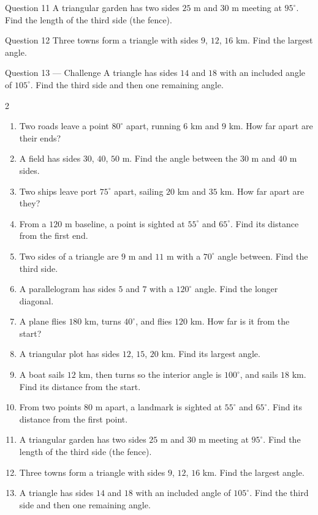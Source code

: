 \documentclass[11pt]{article}
\begin{document}
\begin{qbox}{Question 11}
A triangular garden has two sides $25$ m and $30$ m meeting at $95^\circ$. Find the length of the third side (the fence).\workspace{2.6cm}
\end{qbox}

\begin{qbox}{Question 12}
Three towns form a triangle with sides $9$, $12$, $16$ km. Find the largest angle.\workspace{2.6cm}
\end{qbox}

\begin{qbox}{Question 13 --- Challenge}
A triangle has sides $14$ and $18$ with an included angle of $105^\circ$. Find the third side and then one remaining angle.\workspace{3.2cm}
\end{qbox}

\clearpage
{}

\begin{recapbox}
\begin{multicols}{2}
\small
\begin{enumerate}[leftmargin=*,itemsep=3pt]
  \item Two roads leave a point $80^\circ$ apart, running $6$ km and $9$ km. How far apart are their ends?
  \item A field has sides $30$, $40$, $50$ m. Find the angle between the $30$ m and $40$ m sides.
  \item Two ships leave port $75^\circ$ apart, sailing $20$ km and $35$ km. How far apart are they?
  \item From a $120$ m baseline, a point is sighted at $55^\circ$ and $65^\circ$. Find its distance from the first end.
  \item Two sides of a triangle are $9$ m and $11$ m with a $70^\circ$ angle between. Find the third side.
  \item A parallelogram has sides $5$ and $7$ with a $120^\circ$ angle. Find the longer diagonal.
  \item A plane flies $180$ km, turns $40^\circ$, and flies $120$ km. How far is it from the start?
  \item A triangular plot has sides $12$, $15$, $20$ km. Find its largest angle.
  \item A boat sails $12$ km, then turns so the interior angle is $100^\circ$, and sails $18$ km. Find its distance from the start.
  \item From two points $80$ m apart, a landmark is sighted at $55^\circ$ and $65^\circ$. Find its distance from the first point.
  \item A triangular garden has two sides $25$ m and $30$ m meeting at $95^\circ$. Find the length of the third side (the fence).
  \item Three towns form a triangle with sides $9$, $12$, $16$ km. Find the largest angle.
  \item A triangle has sides $14$ and $18$ with an included angle of $105^\circ$. Find the third side and then one remaining angle.
\end{enumerate}
\end{multicols}
\end{recapbox}
\end{document}
